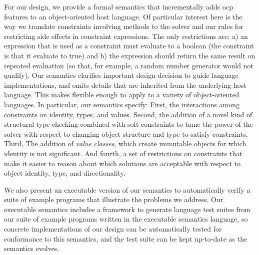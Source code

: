 For our design, we provide a formal semantics that incrementally adds
\gls{ocp} features to an object-oriented host language. Of particular
interest here is the way we translate constraints involving methods to
the solver and our rules for restricting side effects in constraint
expressions. The only restrictions are: a) an expression that is used
as a constraint must evaluate to a boolean (the constraint is that it
evaluate to true) and b) the expression should return the same result
on repeated evaluation (so that, for example, a random number
generator would not qualify). Our semantics clarifies important design
decision to guide language implementations, and omits details that are
inherited from the underlying host language. This makes flexible
enough to apply to a variety of object-oriented languages. In
particular, our semantics specify: First, the interactions among
constraints on identity, types, and values. Second, the addition of a
novel kind of structural type-checking combined with soft constraints
to tame the power of the solver with respect to changing object
structure and type to satisfy constraints. Third, The addition of
\emph{value classes}, which create immutable objects for which
identity is not significant. And fourth, a set of restrictions on
constraints that make it easier to reason about which solutions are
acceptable with respect to object identity, type, and directionality.

We also present an executable version of our semantics to
automatically verify a suite of example programs that illustrate the
problems we address. Our executable semantics includes a framework to
generate language test suites from our suite of example programs
written in the executable semantics language, so concrete
implementations of our design can be automatically tested for
conformance to this semantics, and the test suite can be kept
up-to-date as the semantics evolves.

